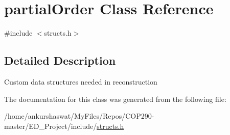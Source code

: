 \hypertarget{classpartialOrder}{}\section{partial\+Order Class Reference}
\label{classpartialOrder}


{\ttfamily \#include $<$structs.\+h$>$}



\subsection{Detailed Description}
Custom data structures needed in reconstruction 

The documentation for this class was generated from the following file\+:\begin{DoxyCompactItemize}
\item 
/home/ankurshaswat/\+My\+Files/\+Repos/\+C\+O\+P290-\/master/\+E\+D\+\_\+\+Project/include/\hyperlink{structs_8h}{structs.\+h}\end{DoxyCompactItemize}
